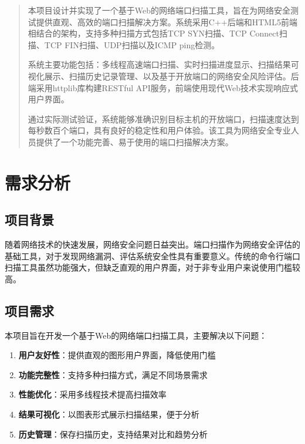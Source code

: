 \documentclass[12pt,hyperref,a4paper,UTF8]{ctexart}
\begin{document}
\cover

\begin{abstract}

本项目设计并实现了一个基于Web的网络端口扫描工具，旨在为网络安全测试提供直观、高效的端口扫描解决方案。系统采用C++后端和HTML5前端相结合的架构，支持多种扫描方式包括TCP SYN扫描、TCP Connect扫描、TCP FIN扫描、UDP扫描以及ICMP ping检测。

系统主要功能包括：多线程高速端口扫描、实时扫描进度显示、扫描结果可视化展示、扫描历史记录管理、以及基于开放端口的网络安全风险评估。后端采用httplib库构建RESTful API服务，前端使用现代Web技术实现响应式用户界面。

通过实际测试验证，系统能够准确识别目标主机的开放端口，扫描速度达到每秒数百个端口，具有良好的稳定性和用户体验。该工具为网络安全专业人员提供了一个功能完善、易于使用的端口扫描解决方案。

\end{abstract}

\thispagestyle{empty} %

\newpage
\tableofcontents

\newpage
\section{需求分析}

\subsection{项目背景}
随着网络技术的快速发展，网络安全问题日益突出。端口扫描作为网络安全评估的基础工具，对于发现网络漏洞、评估系统安全性具有重要意义。传统的命令行端口扫描工具虽然功能强大，但缺乏直观的用户界面，对于非专业用户来说使用门槛较高。

\subsection{项目需求}
本项目旨在开发一个基于Web的网络端口扫描工具，主要解决以下问题：

\begin{enumerate}
    \item \textbf{用户友好性}：提供直观的图形用户界面，降低使用门槛
    \item \textbf{功能完整性}：支持多种扫描方式，满足不同场景需求
    \item \textbf{性能优化}：采用多线程技术提高扫描效率
    \item \textbf{结果可视化}：以图表形式展示扫描结果，便于分析
    \item \textbf{历史管理}：保存扫描历史，支持结果对比和趋势分析
\end{enumerate}
\end{document}
